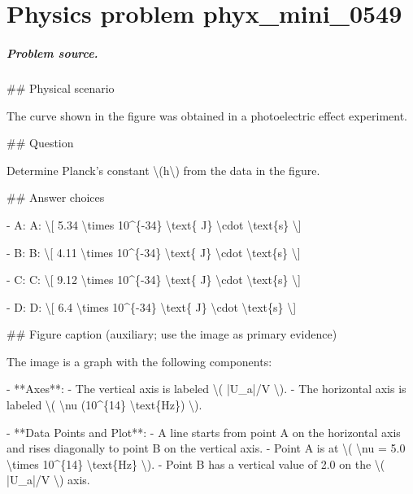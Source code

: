 
\chapter{Physics problem phyx\_mini\_0549}
\label{ch:PhyXMiniProblems_problem_phyx_mini_0549}

\paragraph{Problem source.}
\#\# Physical scenario

The curve shown in the figure was obtained in a photoelectric effect experiment.

\#\# Question

Determine Planck's constant \textbackslash{}(h\textbackslash{}) from the data in the figure.

\#\# Answer choices

- A: A: \textbackslash{}[ 5.34 \textbackslash{}times 10\textasciicircum{}\{-34\} \textbackslash{}text\{ J\} \textbackslash{}cdot \textbackslash{}text\{s\} \textbackslash{}]

- B: B: \textbackslash{}[ 4.11 \textbackslash{}times 10\textasciicircum{}\{-34\} \textbackslash{}text\{ J\} \textbackslash{}cdot \textbackslash{}text\{s\} \textbackslash{}]

- C: C: \textbackslash{}[ 9.12 \textbackslash{}times 10\textasciicircum{}\{-34\} \textbackslash{}text\{ J\} \textbackslash{}cdot \textbackslash{}text\{s\} \textbackslash{}]

- D: D: \textbackslash{}[ 6.4 \textbackslash{}times 10\textasciicircum{}\{-34\} \textbackslash{}text\{ J\} \textbackslash{}cdot \textbackslash{}text\{s\} \textbackslash{}]

\#\# Figure caption (auxiliary; use the image as primary evidence)

The image is a graph with the following components:

- **Axes**:
  - The vertical axis is labeled \textbackslash{}( |U\_a|/V \textbackslash{}).
  - The horizontal axis is labeled \textbackslash{}( \textbackslash{}nu (10\textasciicircum{}\{14\} \textbackslash{}text\{Hz\}) \textbackslash{}).

- **Data Points and Plot**:
  - A line starts from point A on the horizontal axis and rises diagonally to point B on the vertical axis.
  - Point A is at \textbackslash{}( \textbackslash{}nu = 5.0 \textbackslash{}times 10\textasciicircum{}\{14\} \textbackslash{}text\{Hz\} \textbackslash{}).
  - Point B has a vertical value of 2.0 on the \textbackslash{}( |U\_a|/V \textbackslash{}) axis.

